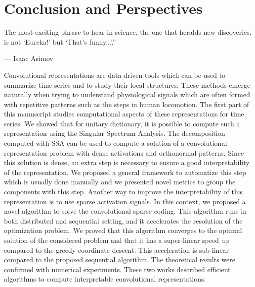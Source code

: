 \documentclass[../thesis.tex]{subfiles}
\begin{document}
\chapter*{Conclusion and Perspectives}

\epigraph{The most exciting phrase to hear in science, the one that heralds new discoveries,
		  is not `Eureka!' but `That's funny...'.''}{--- Isaac Asimov}

	Convolutional representations are data-driven tools which can be used to summarize time
	series and to study their local structures. These methods emerge naturally when trying
	to understand physiological signals which are often formed with repetitive patterns such
	as the steps in human locomotion. The first part of this manuscript studies computational
	aspects of these representations for time series. We showed that for unitary dictionary,
	it is possible to compute such a representation using the Singular Spectrum Analysis. The
	decomposition computed with SSA can be used to compute
	a solution of a convolutional representation problem with dense activations and orthonormal
	patterns. Since this solution is dense, an extra step is necessary to ensure a good
	interpretability of the representation. We proposed a general framework to automatize this
	step which is usually done manually and we presented novel metrics to group the components
	with this step. Another way to improve the interpretability of this representation is to use
	sparse activation signals. In this context, we proposed a novel algorithm to solve the
	convolutional sparse coding. This algorithm runs in both distributed and sequential
	setting, and it accelerates the resolution of the optimization problem. We proved that
	this algorithm converges to the optimal solution of the considered problem and that it
	has a super-linear speed up compared to the greedy coordinate descent. This acceleration
	is sub-linear compared to the proposed sequential algorithm. The theoretical results
	were confirmed with numerical experiments. These two works described efficient algorithms
	to compute interpretable convolutional representations.
\end{document}
